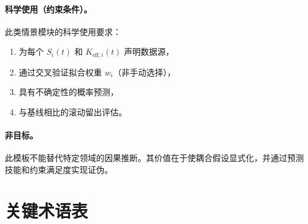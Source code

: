 \documentclass[11pt,a4paper]{article}
\begin{document}
	\paragraph{科学使用（约束条件）。}
	此类情景模块的科学使用要求：
	\begin{enumerate}[leftmargin=*]
		\item 为每个 $S_i(t)$ 和 $K_{\mathrm{eff},i}(t)$ 声明数据源，
		\item 通过交叉验证拟合权重 $w_i$（非手动选择），
		\item 具有不确定性的概率预测，
		\item 与基线相比的滚动留出评估。
	\end{enumerate}
	
	\paragraph{非目标。}
	此模板不能替代特定领域的因果推断。其价值在于使耦合假设显式化，并通过预测技能和约束满足度实现证伪。
	
	\section*{关键术语表}
	
\end{document}
